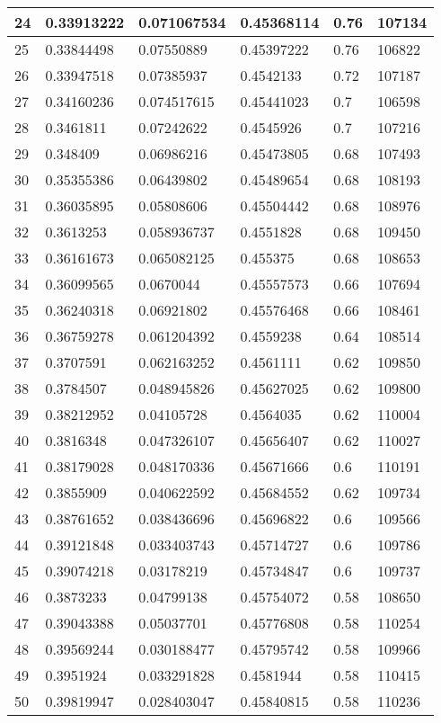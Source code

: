 \begin{longtable}{|l|l|l|l|l|l|}
24 & 0.33913222 & 0.071067534 & 0.45368114 & 0.76 & 107134 \\ \hline 
25 & 0.33844498 & 0.07550889 & 0.45397222 & 0.76 & 106822 \\ \hline 
26 & 0.33947518 & 0.07385937 & 0.4542133 & 0.72 & 107187 \\ \hline 
27 & 0.34160236 & 0.074517615 & 0.45441023 & 0.7 & 106598 \\ \hline 
28 & 0.3461811 & 0.07242622 & 0.4545926 & 0.7 & 107216 \\ \hline 
29 & 0.348409 & 0.06986216 & 0.45473805 & 0.68 & 107493 \\ \hline 
30 & 0.35355386 & 0.06439802 & 0.45489654 & 0.68 & 108193 \\ \hline 
31 & 0.36035895 & 0.05808606 & 0.45504442 & 0.68 & 108976 \\ \hline 
32 & 0.3613253 & 0.058936737 & 0.4551828 & 0.68 & 109450 \\ \hline 
33 & 0.36161673 & 0.065082125 & 0.455375 & 0.68 & 108653 \\ \hline 
34 & 0.36099565 & 0.0670044 & 0.45557573 & 0.66 & 107694 \\ \hline 
35 & 0.36240318 & 0.06921802 & 0.45576468 & 0.66 & 108461 \\ \hline 
36 & 0.36759278 & 0.061204392 & 0.4559238 & 0.64 & 108514 \\ \hline 
37 & 0.3707591 & 0.062163252 & 0.4561111 & 0.62 & 109850 \\ \hline 
38 & 0.3784507 & 0.048945826 & 0.45627025 & 0.62 & 109800 \\ \hline 
39 & 0.38212952 & 0.04105728 & 0.4564035 & 0.62 & 110004 \\ \hline 
40 & 0.3816348 & 0.047326107 & 0.45656407 & 0.62 & 110027 \\ \hline 
41 & 0.38179028 & 0.048170336 & 0.45671666 & 0.6 & 110191 \\ \hline 
42 & 0.3855909 & 0.040622592 & 0.45684552 & 0.62 & 109734 \\ \hline 
43 & 0.38761652 & 0.038436696 & 0.45696822 & 0.6 & 109566 \\ \hline 
44 & 0.39121848 & 0.033403743 & 0.45714727 & 0.6 & 109786 \\ \hline 
45 & 0.39074218 & 0.03178219 & 0.45734847 & 0.6 & 109737 \\ \hline 
46 & 0.3873233 & 0.04799138 & 0.45754072 & 0.58 & 108650 \\ \hline 
47 & 0.39043388 & 0.05037701 & 0.45776808 & 0.58 & 110254 \\ \hline 
48 & 0.39569244 & 0.030188477 & 0.45795742 & 0.58 & 109966 \\ \hline 
49 & 0.3951924 & 0.033291828 & 0.4581944 & 0.58 & 110415 \\ \hline 
50 & 0.39819947 & 0.028403047 & 0.45840815 & 0.58 & 110236 \\ \hline 
\end{longtable}